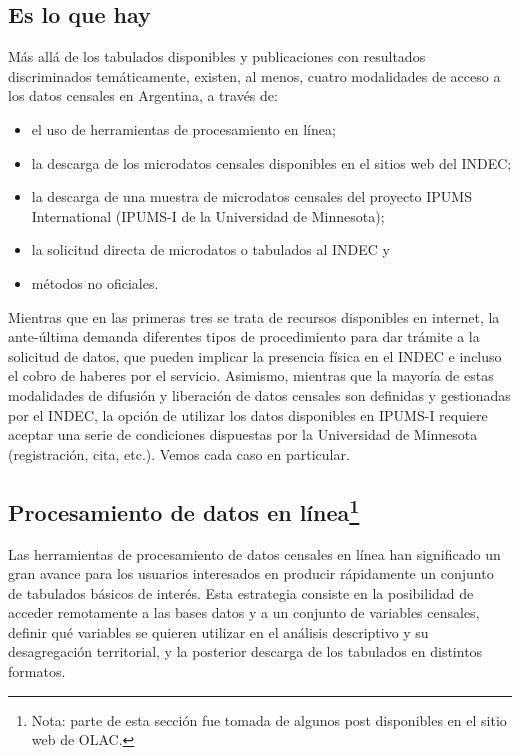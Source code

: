 \documentclass[
]{book}
\providecommand{\tightlist}{%
  \setlength{\itemsep}{0pt}\setlength{\parskip}{0pt}}
\begin{document}
\hypertarget{es-lo-que-hay}{%
\subsection{Es lo que hay}\label{es-lo-que-hay}}

Más allá de los tabulados disponibles y publicaciones con resultados discriminados temáticamente, existen, al menos, cuatro modalidades de acceso a los datos censales en Argentina, a través de:

\begin{itemize}
\tightlist
\item
  el uso de herramientas de procesamiento en línea;
\item
  la descarga de los microdatos censales disponibles en el sitios web del INDEC;
\item
  la descarga de una muestra de microdatos censales del proyecto IPUMS International (IPUMS-I de la Universidad de Minnesota);
\item
  la solicitud directa de microdatos o tabulados al INDEC y
\item
  métodos no oficiales.
\end{itemize}

Mientras que en las primeras tres se trata de recursos disponibles en internet, la ante-última demanda diferentes tipos de procedimiento para dar trámite a la solicitud de datos, que pueden implicar la presencia física en el INDEC e incluso el cobro de haberes por el servicio. Asimismo, mientras que la mayoría de estas modalidades de difusión y liberación de datos censales son definidas y gestionadas por el INDEC, la opción de utilizar los datos disponibles en IPUMS-I requiere aceptar una serie de condiciones dispuestas por la Universidad de Minnesota (registración, cita, etc.). Vemos cada caso en particular.

\hypertarget{procesamiento-de-datos-en-luxednea}{%
\subsection[Procesamiento de datos en línea]{\texorpdfstring{Procesamiento de datos en línea\footnote{Nota: parte de esta sección fue tomada de algunos post disponibles en el sitio web de OLAC.}}{Procesamiento de datos en línea}}\label{procesamiento-de-datos-en-luxednea}}

Las herramientas de procesamiento de datos censales en línea han significado un gran avance para los usuarios interesados en producir rápidamente un conjunto de tabulados básicos de interés. Esta estrategia consiste en la posibilidad de acceder remotamente a las bases datos y a un conjunto de variables censales, definir qué variables se quieren utilizar en el análisis descriptivo y su desagregación territorial, y la posterior descarga de los tabulados en distintos formatos.
\end{document}
